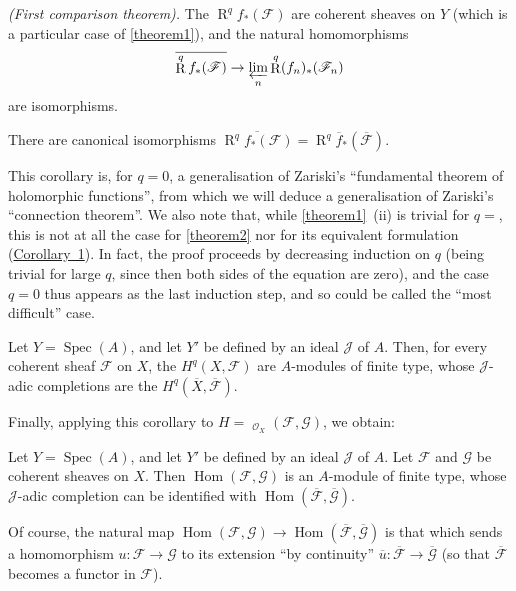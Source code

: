 \documentclass{article}
\theoremstyle{plain}
\newenvironment{theorem}[1]
  {\renewcommand\theinnercustomtheorem{#1}\innercustomtheorem}
  {\endinnercustomtheorem}
\newenvironment{corollary}[1]
  {\renewcommand\theinnercustomcorollary{#1}\innercustomcorollary}
  {\endinnercustomcorollary}
\theoremstyle{definition}
\newcommand{\sh}{\mathscr}
\DeclareMathOperator{\Spec}{Spec}
\DeclareMathOperator{\RR}{R}
\DeclareMathOperator{\Hom}{Hom}
\DeclareMathOperator{\shHom}{\underline{\Hom}}
\begin{document}
\begin{theorem}{2}
\label{theorem2}
  \emph{(First comparison theorem).}
  The $\RR^q f_*(\sh{F})$ are coherent sheaves on $Y$ (which is a particular case of \cref{theorem1}), and the natural homomorphisms
  \[
    \overline{\RR^q f_*(\sh{F})} \to \varprojlim_n \RR^q (f_n)_*(\sh{F}_n)
  \]
  are isomorphisms.
\end{theorem}

\begin{corollary}{1}
\label{theorem2corollary1}
  There are canonical isomorphisms $\overline{\RR^q f_*(\sh{F})} = \RR^q\overline{f}_*(\overline{\sh{F}})$.
\end{corollary}

This corollary is, for $q=0$, a generalisation of Zariski's ``fundamental theorem of holomorphic functions'', from which we will deduce a generalisation of Zariski's ``connection theorem''.
We also note that, while \cref{theorem1}~(ii) is trivial for $q=$, this is not at all the case for \cref{theorem2} nor for its equivalent formulation (\hyperref[theorem2corollary1]{Corollary~1}).
In fact, the proof proceeds by decreasing induction on $q$ (being trivial for large $q$, since then both sides of the equation are zero), and the case $q=0$ thus appears as the last induction step, and so could be called the ``most difficult'' case.

\begin{corollary}{2}
\label{theorem2corollary2}
  Let $Y=\Spec(A)$, and let $Y'$ be defined by an ideal $\sh{J}$ of $A$.
  Then, for every coherent sheaf $\sh{F}$ on $X$, the $H^q(X,\sh{F})$ are $A$-modules of finite type, whose $\sh{J}$-adic completions are the $H^q(\overline{X},\overline{\sh{F}})$.
\end{corollary}

Finally, applying this corollary to $H=\shHom_{\sh{O}_X}(\sh{F},\sh{G})$, we obtain:

\begin{corollary}{3}
\label{theorem2corollary3}
  Let $Y=\Spec(A)$, and let $Y'$ be defined by an ideal $\sh{J}$ of $A$.
  Let $\sh{F}$ and $\sh{G}$ be coherent sheaves on $X$.
  Then $\Hom(\sh{F},\sh{G})$ is an $A$-module of finite type, whose $\sh{J}$-adic completion can be identified with $\Hom(\overline{\sh{F}},\overline{\sh{G}})$.
\end{corollary}

Of course, the natural map $\Hom(\sh{F},\sh{G})\to\Hom(\overline{\sh{F}},\overline{\sh{G}})$ is that which sends a homomorphism $u\colon\sh{F}\to\sh{G}$ to its extension ``by continuity'' $\overline{u}\colon\overline{\sh{F}}\to\overline{\sh{G}}$ (so that $\overline{\sh{F}}$ becomes a functor in $\sh{F}$).
\end{document}
